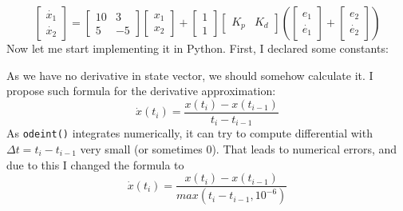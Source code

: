 \documentclass[a4paper,12pt]{article}
\begin{document}
    \begin{equation*}
        \begin{bmatrix}
            \dot{x_1}\\
            \dot{x_2}
        \end{bmatrix}
        = 
        \begin{bmatrix}
            10 & 3 \\
            5 & -5
        \end{bmatrix}
        \begin{bmatrix}
            x_1\\
            x_2
        \end{bmatrix}
        +
        \begin{bmatrix}
            1 \\
            1
        \end{bmatrix}
        \begin{bmatrix}
            K_p & K_d
        \end{bmatrix}
        \left(
            \begin{bmatrix}
                e_1\\
                \dot{e_1}
            \end{bmatrix}
            +
            \begin{bmatrix}
                e_2\\
                \dot{e_2}
            \end{bmatrix}
        \right)
    \end{equation*}
    Now let me start implementing it in Python. First, I declared some constants:
    
    As we have no derivative in state vector, we should somehow calculate it. I 
    propose such formula for the derivative approximation:
    \begin{equation*}
        \dot x(t_i) = \frac{x(t_i) - x(t_{i-1})}{t_i - t_{i-1}}
    \end{equation*}
    As \texttt{odeint()} integrates numerically, it can try to compute differential
    with $\Delta t = t_i - t_{i-1}$ very small (or sometimes 0). That leads to numerical errors, and due to this
    I changed the formula to 
    \begin{equation*}
        \dot x(t_i) = \frac{x(t_i) - x(t_{i-1})}{max(t_i - t_{i-1}, 10^{-6})}
    \end{equation*}
        
\end{document}
